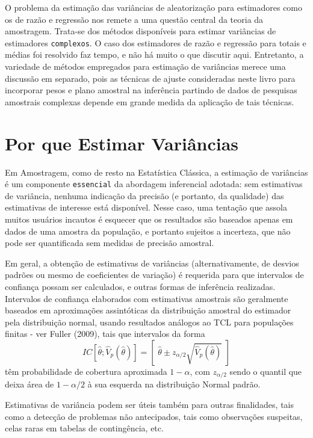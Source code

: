\documentclass[
  12pt,
  brazilian,
]{book}
\theoremstyle{definition}
\theoremstyle{definition}
\theoremstyle{definition}
\theoremstyle{definition}
\theoremstyle{remark}
\begin{document}
O problema da estimação das variâncias de aleatorização para estimadores como os de razão e regressão nos remete a uma questão central da teoria da amostragem. Trata-se dos métodos disponíveis para estimar variâncias de estimadores \texttt{complexos}. O caso dos estimadores de razão e regressão para totais e médias foi resolvido faz tempo, e não há muito o que discutir aqui. Entretanto, a variedade de métodos empregados para estimação de variâncias merece uma discussão em separado, pois as técnicas de ajuste consideradas neste livro para incorporar pesos e plano amostral na inferência partindo de dados de pesquisas amostrais complexas depende em grande medida da aplicação de tais técnicas.

\hypertarget{por-que-estimar-variuxe2ncias}{%
\section{Por que Estimar Variâncias}\label{por-que-estimar-variuxe2ncias}}

Em Amostragem, como de resto na Estatística Clássica, a estimação de variâncias é um componente \texttt{essencial} da abordagem inferencial adotada: sem estimativas de variância, nenhuma indicação da precisão (e portanto, da qualidade) das estimativas
de interesse está disponível. Nesse caso, uma tentação que assola muitos usuários incautos é esquecer que os resultados são baseados apenas em dados de uma amostra da população, e portanto sujeitos a incerteza, que não pode ser quantificada sem medidas de precisão amostral.

Em geral, a obtenção de estimativas de variâncias (alternativamente, de desvios padrões ou mesmo de coeficientes de variação) é requerida para que intervalos de confiança possam ser calculados, e outras formas de inferência realizadas. Intervalos de confiança elaborados com estimativas amostrais são geralmente
baseados em aproximações assintóticas da distribuição amostral do estimador pela distribuição normal, usando resultados análogos ao TCL para populações finitas - ver Fuller (2009), tais que intervalos da forma
\[
IC\left[ \widehat{\theta };\widehat{V}_{p}\left( \widehat{\theta }\right)
\right] =\left[ \,\, \widehat{\theta } \pm z_{\alpha /2}\sqrt{\widehat{V}_{p} \left( \widehat{\theta} \right) } \,\, \right] 
\]
têm probabilidade de cobertura aproximada \(1-\alpha\), com \(z_{\alpha /2}\) sendo o quantil que deixa área de \(1-\alpha/2\) à sua esquerda na distribuição Normal padrão.

Estimativas de variância podem ser úteis também para outras finalidades, tais como a detecção de problemas não antecipados, tais como observações suspeitas, celas raras em tabelas de contingência, etc.
\end{document}
